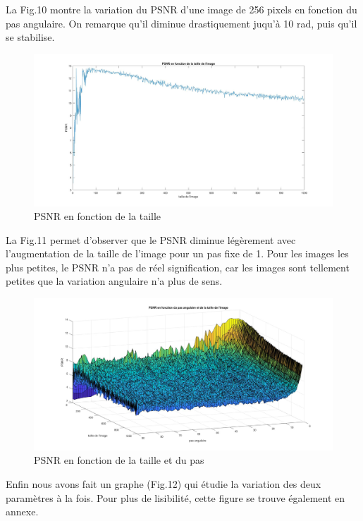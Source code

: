 \documentclass[conference]{IEEEtran}
\begin{document}
La Fig.10 montre la variation du PSNR d'une image de 256 pixels en fonction du pas angulaire. On remarque qu'il diminue drastiquement juqu'à 10 rad, puis qu'il se stabilise.

\begin{figure}[H]
\centering
\includegraphics[scale=0.13]{PSNR3}
	\caption[PSNR en fonction de la taille]{PSNR en fonction de la taille}
\label{fig:gallery}
\end{figure}

La Fig.11 permet d'observer que le PSNR diminue légèrement avec l'augmentation de la taille de l'image pour un pas fixe de 1. Pour les images les plus petites, le PSNR n'a pas de réel signification, car les images sont tellement petites que la variation angulaire n'a plus de sens.

\begin{figure}[H]
\centering
\includegraphics[scale=0.13]{PSNR1}
	\caption[PSNR en fonction de la taille et du pas]{PSNR en fonction de la taille et du pas}
\label{fig:gallery}
\end{figure}

Enfin nous avons fait un graphe (Fig.12) qui étudie la variation des deux paramètres à la fois. Pour plus de lisibilité, cette figure se trouve également en annexe.
 
\end{document}
